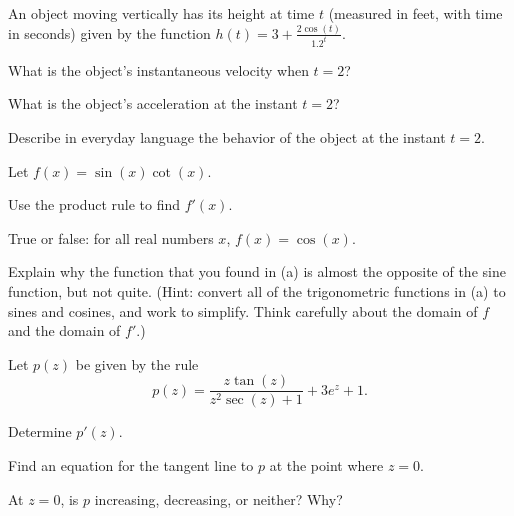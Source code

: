 \begin{exercises} 
\item An object moving vertically has its height at time $t$ (measured in feet, with time in seconds) given by the function $h(t) = 3 + \frac{2\cos(t)}{1.2^t}$.
\ba
	\item What is the object's instantaneous velocity when $t =2$?
	\item What is the object's acceleration at the instant $t = 2$?
	\item Describe in everyday language the behavior of the object at the instant $t = 2$.
\ea
\item Let $f(x) = \sin(x) \cot(x)$.
\ba
	\item Use the product rule to find $f'(x)$.
	\item True or false: for all real numbers $x$, $f(x) = \cos(x)$.
	\item Explain why the function that you found in (a) is almost the opposite of the sine function, but not quite.  (Hint: convert all of the trigonometric functions in (a) to sines and cosines, and work to simplify.  Think carefully about the domain of $f$ and the domain of $f'$.)
\ea
\item Let $p(z)$ be given by the rule
$$p(z) = \frac{z\tan(z)}{z^2\sec(z) + 1} + 3 e^z + 1.$$
\ba
	\item Determine $p'(z)$.
	\item Find an equation for the tangent line to $p$ at the point where $z = 0$.
	\item At $z = 0$, is $p$ increasing, decreasing, or neither?  Why?
\ea
\end{exercises}
\afterexercises